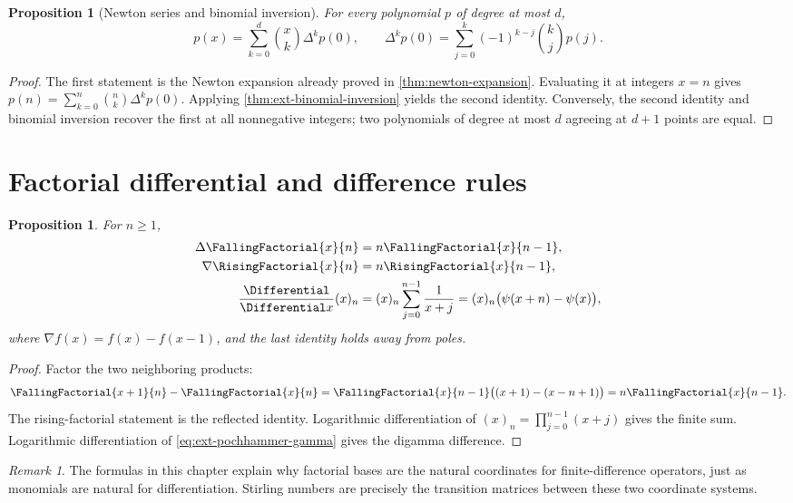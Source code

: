 \documentclass[11pt,a4paper,oneside,openany]{book}
\newtheorem{proposition}[theorem]{Proposition}
\theoremstyle{definition}
\theoremstyle{remark}
\newtheorem{remark}[theorem]{Remark}
\begin{document}
\begin{proposition}[Newton series and binomial inversion]
For every polynomial \(p\) of degree at most \(d\),
\begin{equation}\label{eq:ext-newton-binomial}
 p(x)=\sum_{k=0}^d\binom{x}{k}\Delta^kp(0),
 \qquad
 \Delta^kp(0)=\sum_{j=0}^k(-1)^{k-j}\binom kjp(j).
\end{equation}
\end{proposition}
\begin{proof}
The first statement is the Newton expansion already proved in
\cref{thm:newton-expansion}.  Evaluating it at integers \(x=n\) gives
\(p(n)=\sum_{k=0}^n\binom nk\Delta^kp(0)\).  Applying
\cref{thm:ext-binomial-inversion} yields the second identity.  Conversely, the
second identity and binomial inversion recover the first at all nonnegative
integers; two polynomials of degree at most \(d\) agreeing at \(d+1\) points are
equal.
\end{proof}

\section{Factorial differential and difference rules}

\begin{proposition}
For \(n\ge1\),
\begin{align}
 \Delta\FallingFactorial{x}{n}&=n\FallingFactorial{x}{n-1},\label{eq:ext-delta-falling}\\
 \nabla\RisingFactorial{x}{n}&=n\RisingFactorial{x}{n-1},\label{eq:ext-nabla-rising}\\
 \frac{\Differential}{\Differential x}(x)_n
 &=(x)_n\sum_{j=0}^{n-1}\frac1{x+j}
 =(x)_n\bigl(\psi(x+n)-\psi(x)\bigr),\label{eq:ext-pochhammer-derivative}
\end{align}
where \(\nabla f(x)=f(x)-f(x-1)\), and the last identity holds away from poles.
\end{proposition}
\begin{proof}
Factor the two neighboring products:
\[
 \FallingFactorial{x+1}{n}-\FallingFactorial{x}{n}
 =\FallingFactorial{x}{n-1}\bigl((x+1)-(x-n+1)\bigr)
 =n\FallingFactorial{x}{n-1}.
\]
The rising-factorial statement is the reflected identity.  Logarithmic
differentiation of \((x)_n=\prod_{j=0}^{n-1}(x+j)\) gives the finite sum.
Logarithmic differentiation of \eqref{eq:ext-pochhammer-gamma} gives the
digamma difference.
\end{proof}

\begin{remark}
The formulas in this chapter explain why factorial bases are the natural
coordinates for finite-difference operators, just as monomials are natural for
differentiation.  Stirling numbers are precisely the transition matrices
between these two coordinate systems.
\end{remark}
\end{document}
